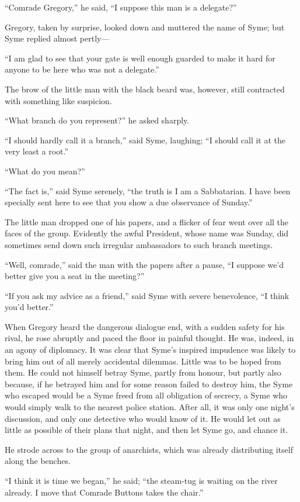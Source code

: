 “Comrade Gregory,” he said, “I suppose this man is a delegate?”

Gregory, taken by surprise, looked down and muttered the name of Syme; but Syme replied almost pertly⁠—

“I am glad to see that your gate is well enough guarded to make it hard for anyone to be here who was not a delegate.”

The brow of the little man with the black beard was, however, still contracted with something like suspicion.

“What branch do you represent?” he asked sharply.

“I should hardly call it a branch,” said Syme, laughing; “I should call it at the very least a root.”

“What do you mean?”

“The fact is,” said Syme serenely, “the truth is I am a Sabbatarian. I have been specially sent here to see that you show a due observance of Sunday.”

The little man dropped one of his papers, and a flicker of fear went over all the faces of the group. Evidently the awful President, whose name was Sunday, did sometimes send down such irregular ambassadors to such branch meetings.

“Well, comrade,” said the man with the papers after a pause, “I suppose we’d better give you a seat in the meeting?”

“If you ask my advice as a friend,” said Syme with severe benevolence, “I think you’d better.”

When Gregory heard the dangerous dialogue end, with a sudden safety for his rival, he rose abruptly and paced the floor in painful thought. He was, indeed, in an agony of diplomacy. It was clear that Syme’s inspired impudence was likely to bring him out of all merely accidental dilemmas. Little was to be hoped from them. He could not himself betray Syme, partly from honour, but partly also because, if he betrayed him and for some reason failed to destroy him, the Syme who escaped would be a Syme freed from all obligation of secrecy, a Syme who would simply walk to the nearest police station. After all, it was only one night’s discussion, and only one detective who would know of it. He would let out as little as possible of their plans that night, and then let Syme go, and chance it.

He strode across to the group of anarchists, which was already distributing itself along the benches.

“I think it is time we began,” he said; “the steam-tug is waiting on the river already. I move that Comrade Buttons takes the chair.”

